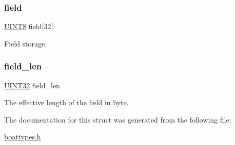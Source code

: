 \subsubsection{\texorpdfstring{field}{field}}
{\footnotesize\ttfamily \mbox{\hyperlink{boattypes_8h_ab27e9918b538ce9d8ca692479b375b6a}{U\+I\+N\+T8}} field\mbox{[}32\mbox{]}}



Field storage. 

\mbox{\label{struct_t_tx_field_max32_b_a37f1b9ab89b19244af4f685f3b6e384a}} 
\subsubsection{\texorpdfstring{field\+\_\+len}{field\_len}}
{\footnotesize\ttfamily \mbox{\hyperlink{boattypes_8h_ae1e6edbbc26d6fbc71a90190d0266018}{U\+I\+N\+T32}} field\+\_\+len}



The effective length of the field in byte. 



The documentation for this struct was generated from the following file\+:\begin{DoxyCompactItemize}
\item 
\mbox{\hyperlink{boattypes_8h}{boattypes.\+h}}\end{DoxyCompactItemize}
